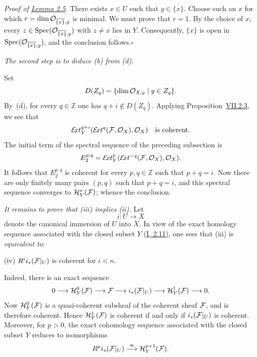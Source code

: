 \medskip
\noindent\textit{Proof of \hyperref[VIII.2.5]{Lemma 2.5}.} There exists $x\in U$ such that
$y\in\overline{\{x\}}$. Choose such an $x$ for which
$r=\dim\mathcal O_{\overline{\{x\}},y}$ is minimal. We must prove that $r=1$.
By the choice of $x$, every
$z\in\operatorname{Spec}(\mathcal O_{\overline{\{x\}},y})$ with $z\ne x$ lies in $Y$.
Consequently, $\{x\}$ is open in
$\operatorname{Spec}(\mathcal O_{\overline{\{x\}},y})$, and the conclusion follows.\hfill$\square$


\medskip
\noindent\textit{The second step is to deduce \textup{(b)} from
\textup{(d)}.}

\medskip
Set
\[
  D(Z_q)=\{\dim\mathcal O_{X,y}\mid y\in Z_q\}.
\]
By~\textup{(d)}, for every $q\in\mathbb Z$ one has
$q+i\notin D(Z_q)$. Applying Proposition~\hyperref[VII.2.3]{VII.2.3}, we see that
\[
  \sExt_Y^{q+i}(\sExt^q(\cF,\cO_X),\cO_X)
  \quad\text{is coherent.}
\]
The initial term of the spectral sequence of the preceding subsection is
\[
  E_2^{p,q}
  =\sExt_Y^p(\sExt^{-q}(\cF,\cO_X),\cO_X).
\]
It follows that $E_2^{p,q}$ is coherent for every $p,q\in\mathbb Z$ such
that $p+q=i$. Now there are only finitely many pairs $(p,q)$ such that
$p+q=i$, and this spectral
sequence converges to $\sH_Y^\ast(\cF)$; whence the conclusion.


\medskip
\noindent\textit{It remains to prove that \textup{(iii)} implies
\textup{(ii)}.} Let
\[
  i\colon U\longrightarrow X
\]
denote the canonical immersion of $U$ into $X$. In view of the exact homology
sequence associated with the closed subset $Y$ (\hyperref[I.2.11]{I, 2.11)}, one sees that
\textup{(iii)} is \textit{equivalent to}:

\medskip
\noindent\textup{(iv)} $R^i i_*(\cF|_U)$ is coherent for $i<n$.
\label{condition}

\medskip
{}\quad Indeed, there is
an exact sequence
\[
  0\longrightarrow \sH_Y^0(\cF)\longrightarrow \cF
  \longrightarrow i_*(\cF|_U)\longrightarrow \sH_Y^1(\cF)
  \longrightarrow 0.
\]
Now $\sH_Y^0(\cF)$ is a quasi-coherent subsheaf of the coherent sheaf $\cF$,
and is therefore coherent. Hence $\sH_Y^1(\cF)$ is coherent if and only if
$i_*(\cF|_U)$ is coherent. Moreover, for $p>0$, the exact cohomology sequence
associated with the closed subset $Y$ reduces to isomorphisms
\[
  R^p i_*(\cF|_U)\overset{\approx}{\longrightarrow}\sH_Y^{p+1}(\cF).
\]

